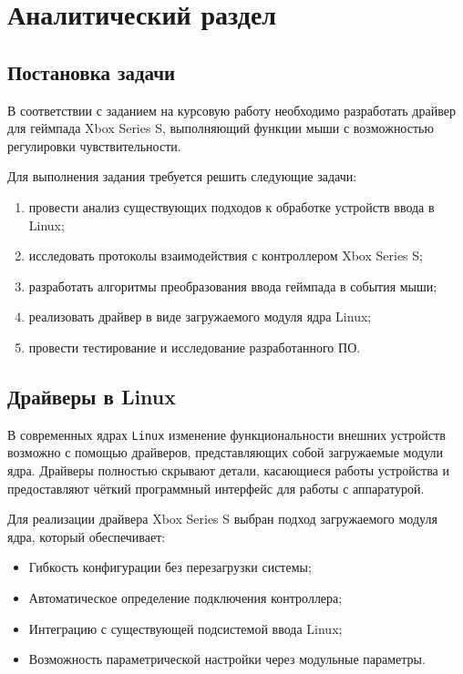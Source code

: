 \chapter{Аналитический раздел}

\section{Постановка задачи}

В соответствии с заданием на курсовую работу необходимо разработать драйвер для геймпада Xbox Series S, выполняющий функции мыши с возможностью регулировки чувствительности.

Для выполнения задания требуется решить следующие задачи:
\begin{enumerate}
	\item провести анализ существующих подходов к обработке устройств ввода в Linux;
	\item исследовать протоколы взаимодействия с контроллером Xbox Series S;
	\item разработать алгоритмы преобразования ввода геймпада в события мыши;
	\item реализовать драйвер в виде загружаемого модуля ядра Linux;
	\item провести тестирование и исследование разработанного ПО.
\end{enumerate}

\section{Драйверы в Linux}

В современных ядрах \texttt{Linux} изменение функциональности внешних устройств возможно с помощью драйверов, представляющих собой загружаемые модули ядра. Драйверы полностью скрывают детали, касающиеся работы устройства и предоставляют чёткий программный интерфейс для работы с аппаратурой. 

Для реализации драйвера Xbox Series S выбран подход загружаемого модуля ядра, который обеспечивает:
\begin{itemize}[label=---]
	\item Гибкость конфигурации без перезагрузки системы;
	\item Автоматическое определение подключения контроллера;
	\item Интеграцию с существующей подсистемой ввода Linux;
	\item Возможность параметрической настройки через модульные параметры.
\end{itemize}

